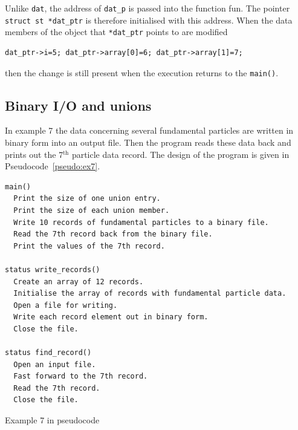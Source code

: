 \documentclass[11pt]{scrartcl}
\def\main{\texttt{main()}}
\def\psc{Pseudocode}
\begin{document}
Unlike \texttt{dat}, the address of \texttt{dat\_p} is passed into
the function fun.  The pointer\\
\texttt{struct~st~*dat\_ptr} is therefore initialised with this
address.  When the data members of the 
object that \texttt{*dat\_ptr} points to are modified
\begin{lstlisting}
dat_ptr->i=5; dat_ptr->array[0]=6; dat_ptr->array[1]=7;
\end{lstlisting}
then the change is still present when the execution returns to the
\main.

\subsection{Binary I/O and unions}
In example 7 the data concerning several fundamental particles are
written in binary form into an output file.  Then the program reads
these data back and prints out the 7$^\mathrm{th}$ particle data record.  The design of the program is given in \psc~\ref{pseudo:ex7}.

\begin{pseudocode}[h]
\begin{verbatim}
main()
  Print the size of one union entry.
  Print the size of each union member.
  Write 10 records of fundamental particles to a binary file.
  Read the 7th record back from the binary file.
  Print the values of the 7th record.

status write_records()
  Create an array of 12 records.
  Initialise the array of records with fundamental particle data.
  Open a file for writing.
  Write each record element out in binary form.
  Close the file.

status find_record()
  Open an input file.
  Fast forward to the 7th record.
  Read the 7th record.
  Close the file.
\end{verbatim}
\caption{Example 7 in pseudocode \label{pseudo:ex7}}
\end{pseudocode}
\end{document}
